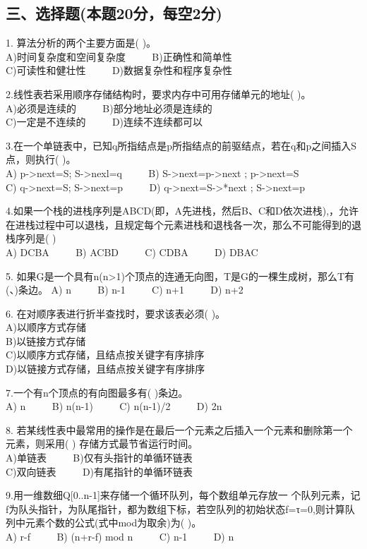 \subsection{三、选择题(本题20分，每空2分)}

1. 算法分析的两个主要方面是( )。 \\
A)时间复杂度和空间复杂度 $\qquad$ B)正确性和简单性 \\
C)可读性和健壮性 $\qquad$ D)数据复杂性和程序复杂性

2.线性表若采用顺序存储结构时，要求内存中可用存储单元的地址( )。 \\
A)必须是连续的 $\qquad$ B)部分地址必须是连续的 \\
C)一定是不连续的 $\qquad$ D)连续不连续都可以

3.在一个单链表中，已知q所指结点是p所指结点的前驱结点，若在q和p之间插入S点，则执行( )。 \\
A) p->next=S; S->nexl=q $\qquad$ B) S->next=p->next ; p->next=S \\
C) q->next=S; S->next=p $\qquad$ D) q->next=S->*next ; S->next=p

4.如果一个栈的进栈序列是ABCD(即，A先进栈，然后B、C和D依次进栈),，允许在进栈过程中可以退栈，且规定每个元素进栈和退栈各一次，那么不可能得到的退栈序列是( ) \\
A) DCBA $\qquad$ B) ACBD $\qquad$ C) CDBA $\qquad$ D) DBAC

5. 如果G是一个具有n(n>1)个顶点的连通无向图，T是G的一棵生成树，那么T有(、)条边。
A) n $\qquad$ B) n-1 $\qquad$ C) n+1 $\qquad$ D) n+2

6. 在对顺序表进行折半查找时，要求该表必须( )。 \\
A)以顺序方式存储 \\
B)以链接方式存储 \\
C)以顺序方式存储，且结点按关键字有序排序 \\
D)以链接方式存储，且结点按关键字有序排序

7.一个有n个顶点的有向图最多有( )条边。 \\
A) n $\qquad$ B) n(n-1) $\qquad$ C) n(n-1)/2 $\qquad$ D) 2n

8. 若某线性表中最常用的操作是在最后一个元素之后插入一个元素和删除第一个元素，则采用( ) 存储方式最节省运行时间。 \\
A)单链表 $\qquad$ B)仅有头指针的单循环链表 \\
C)双向链表 $\qquad$ D)有尾指针的单循环链表

9.用一维数细Q[0..n-1]来存储一个循环队列，每个数组单元存放一 个队列元素，记f为队头指针，为队尾指针，都为数组下标，若空队列的初始状态f=τ=0,则计算队列中元素个数的公式(式中mod为取余)为( )。 \\
A) r-f $\qquad$ B) (n+r-f) mod n $\qquad$ C) n-1 $\qquad$ D) n

